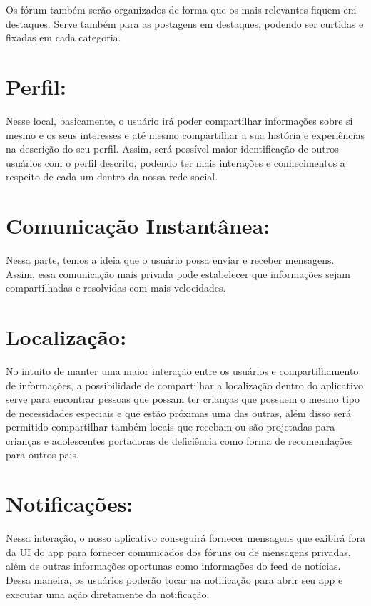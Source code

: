 \begin{apendicesenv}
	Os fórum também serão organizados de forma que os mais relevantes fiquem em destaques. Serve também para as postagens em destaques, podendo ser curtidas e fixadas em cada categoria. 
	
	\section{Perfil:}
	Nesse local, basicamente, o usuário irá poder compartilhar informações sobre si mesmo e os seus interesses e até mesmo compartilhar a sua história e experiências na descrição do seu perfil. Assim, será possível maior identificação de outros usuários com o perfil descrito, podendo ter mais interações e conhecimentos a respeito de cada um dentro da nossa rede social. 
	
	\section{Comunicação Instantânea: }
	Nessa parte, temos a ideia que o usuário possa enviar e receber mensagens. Assim, essa comunicação mais privada pode estabelecer que informações sejam compartilhadas e resolvidas com mais velocidades. 
	
	\section{Localização: }
	No intuito de manter uma maior interação entre os usuários e compartilhamento de informações, a possibilidade de compartilhar a localização dentro do aplicativo serve para encontrar pessoas que possam ter crianças que possuem o mesmo tipo de  necessidades especiais e que estão próximas uma das outras, além disso será permitido compartilhar também locais que recebam ou são projetadas para crianças e adolescentes portadoras de deficiência como forma de recomendações para outros pais. 
	
	\section{Notificações: }
	Nessa interação, o nosso aplicativo conseguirá fornecer mensagens que exibirá fora da UI do app para fornecer comunicados dos fóruns ou de mensagens privadas, além de outras informações oportunas como informações do feed de notícias. Dessa maneira, os usuários poderão tocar na notificação para abrir seu app e executar uma ação diretamente da notificação. 
	
	
	

\end{apendicesenv}

